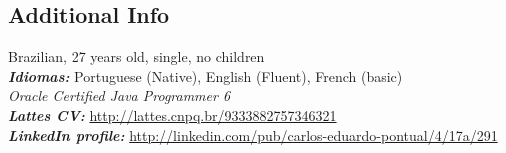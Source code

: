 \documentclass[margin, 10pt]{res} %
\begin{document}
\begin{resume}
\section {Additional Info}
Brazilian, 27 years old, single, no children \\
{\sl\bf Idiomas:} Portuguese (Native), English (Fluent), French (basic) \\
{\sl Oracle Certified Java Programmer 6} \\
{\sl\bf Lattes CV:} \url{http://lattes.cnpq.br/9333882757346321} \\
{\sl\bf LinkedIn profile:} \url{http://linkedin.com/pub/carlos-eduardo-pontual/4/17a/291} \\



\end{resume}
\end{document}
